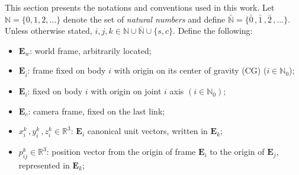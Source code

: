 This section presents the notations and conventions used in this work. Let $\mathbb{N} = \{0,1,2,\dots\}$ denote the set of \textit{natural numbers} and define $\mathbb{\bar{N}} = \{ \bar{0}\,,\bar{1}\,, \bar{2}\,, \hdots \}$. Unless otherwise stated, $i, j, k \in \mathbb{N} \cup \mathbb{\bar{N}} \cup \{s,c\}$.
%
%
Define the following:
%
\begin{itemize}
\item $\mathbf{E}_{w}$: world frame, arbitrarily located;
\item $\mathbf{E}_{\bar{i}}$: frame fixed on body $i$ with origin on its center of gravity (CG) ($i \in \mathbb{N}_0$);
\item $\mathbf{E}_{i}$: fixed on body $i$ with origin on joint $i$ axis $(i \in \mathbb{N}_0)$;
\item $\mathbf{E}_{c}$: camera frame, fixed on the last link;
%
\item $x^k_i\,,y^k_i\,,z^k_i \in \mathbb{R}^{3}$: $\mathbf{E}_i$ canonical unit vectors, written in $\mathbf{E}_k$;
%
%
\item $p^{k}_{ij} \in \mathbb{R}^{3}$: position vector from the origin of frame $\mathbf{E}_i$ to the origin of $\mathbf{E}_{j}$, represented in $\mathbf{E}_k$;

\end{itemize}
